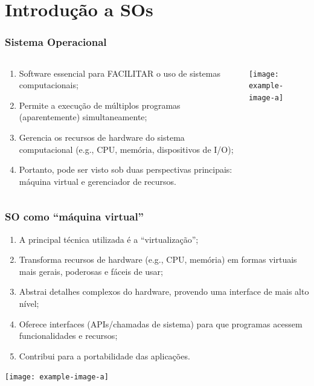 \documentclass{beamer}
\begin{document}
\section{Introdução a SOs}

\begin{frame}[fragile]
    \frametitle{Sistema Operacional}

    \begin{columns}
        \begin{column}{0.55\textwidth}
            \begin{enumerate}\small
                \item Software essencial para FACILITAR o uso de sistemas computacionais;
                \item Permite a execução de múltiplos programas (aparentemente) simultaneamente;
                \item Gerencia os recursos de hardware do sistema computacional (e.g., CPU, memória, dispositivos de I/O);
                \item Portanto, pode ser visto sob duas perspectivas principais: máquina virtual e gerenciador de recursos.
            \end{enumerate}
        \end{column}
        
        \begin{column}{0.45\textwidth}
            \begin{center}
                \texttt{[image: example-image-a]}
            \end{center}
        \end{column}
    \end{columns}
\end{frame}

\begin{frame}[fragile]
    \frametitle{SO como ``máquina virtual''}

    \begin{enumerate}\footnotesize
        \item A principal técnica utilizada é a ``virtualização'';
        \item Transforma recursos de hardware (e.g., CPU, memória) em formas virtuais mais gerais, poderosas e fáceis de usar;
        \item Abstrai detalhes complexos do hardware, provendo uma interface de mais alto nível;
        \item Oferece interfaces (APIs/chamadas de sistema) para que programas acessem funcionalidades e recursos;
        \item Contribui para a portabilidade das aplicações.
    \end{enumerate}

    \vfill
    \begin{center}
        \texttt{[image: example-image-a]}
    \end{center}
\end{frame}
\end{document}
